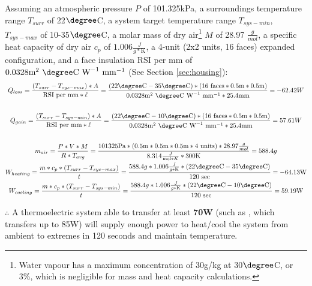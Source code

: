 Assuming an atmospheric pressure $P$ of 101.325kPa, a surroundings temperature range $T_{surr}$ of 22$\degree$C, a system target temperature range $T_{sys-min}$, $T_{sys-max}$ of 10-35$\degree$C, a molar mass of dry air\footnote{Water vapour has a maximum concentration of 30g/kg at 30$\degree$C, or 3\%, which is negligible for mass and heat capacity calculations.} $M$ of 28.97 $\frac g{mol}$, a specific heat capacity of dry air $c_p$ of $1.006 \frac{J}{g*\text{K}}$, a 4-unit (2x2 units, 16 faces) expanded configuration, and a face insulation RSI per mm of $0.0328\text{m}^2~  \degree \text{C}~\text{W}^{-1}~\text{mm}^{-1}$ (See Section \ref{sec:housing}):\\
\vspace{.05cm}
\begin{gather*}
    \label{eqn:heatloss}
    Q_{loss}=\frac{(T_{surr}-T_{sys-max}) * A}{\text{RSI per mm} * \ell}=\frac{(22\degree \text{C}-35\degree \text{C}) * (16 \text{ faces} * 0.5\text{m} * 0.5\text{m})}{0.0328 \text{m}^2~  \degree \text{C}~\text{W}^{-1}~\text{mm}^{-1} * 25.4 \text{mm}}=-62.42 W\\\vspace{.05cm}\\
    \label{eqn:heatgain}
    Q_{gain}=\frac{(T_{surr}-T_{sys-min}) * A}{\text{RSI per mm} * \ell}=\frac{(22\degree \text{C}-10\degree \text{C}) * (16 \text{ faces} * 0.5\text{m} * 0.5\text{m})}{0.0328 \text{m}^2~  \degree \text{C}~\text{W}^{-1}~\text{mm}^{-1} * 25.4 \text{mm}}=57.61 W\\\vspace{.05cm}\\
    \label{eqn:airmass}
    m_{air}=\frac{P*V*M}{R*T_{avg}}=\frac{101325\text{Pa}*(0.5\text{m}*0.5\text{m}*0.5\text{m}*4\text{ units})*28.97\frac g{mol}}{8.314\frac{J}{\text{mol}*K}*300\text{K}}=588.4g\\
    \label{eqn:heating}
    W_{heating}=\frac{m*c_p*(T_{surr}-T_{sys-max})}{t}=\frac{588.4g*1.006\frac{J}{g*\text{K}}*(22\degree \text{C}-35\degree \text{C})}{120\text{ sec}}=-64.13\text{W}\\
    \label{eqn:cooling}
    W_{cooling}=\frac{m*c_p*(T_{surr}-T_{sys-min})}{t}=\frac{588.4g*1.006\frac{J}{g*\text{K}}*(22\degree \text{C}-10\degree \text{C})}{120\text{ sec}}=59.19\text{W}
\end{gather*}

$\therefore$ A thermoelectric system able to transfer at least \textbf{70W} (such as \cite{peltier}, which transfers up to 85W) will supply enough power to heat/cool the system from ambient to extremes in 120 seconds and maintain temperature.

